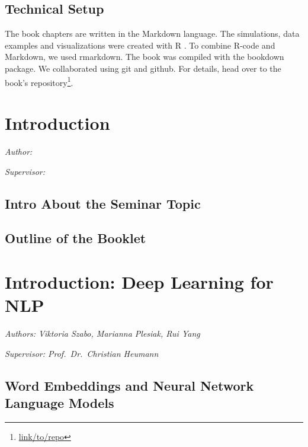 \documentclass[]{krantz}
\renewcommand{\href}[2]{#2\footnote{\url{#1}}}
\begin{document}
\hypertarget{technical-setup}{%
\section*{Technical Setup}\label{technical-setup}}


The book chapters are written in the Markdown language.
The simulations, data examples and visualizations were created with R \citep{rlang}.
To combine R-code and Markdown, we used rmarkdown.
The book was compiled with the bookdown package.
We collaborated using git and github.
For details, head over to the \href{link/to/repo}{book's repository}.

\hypertarget{introduction}{%
\chapter{Introduction}\label{introduction}}

\emph{Author: }

\emph{Supervisor: }

\hypertarget{intro-about-the-seminar-topic}{%
\section{Intro About the Seminar Topic}\label{intro-about-the-seminar-topic}}

\hypertarget{outline-of-the-booklet}{%
\section{Outline of the Booklet}\label{outline-of-the-booklet}}

\hypertarget{introduction-deep-learning-for-nlp}{%
\chapter{Introduction: Deep Learning for NLP}\label{introduction-deep-learning-for-nlp}}

\emph{Authors: Viktoria Szabo, Marianna Plesiak, Rui Yang}

\emph{Supervisor: Prof.~Dr.~Christian Heumann}

\hypertarget{word-embeddings-and-neural-network-language-models}{%
\section{Word Embeddings and Neural Network Language Models}\label{word-embeddings-and-neural-network-language-models}}
\end{document}
